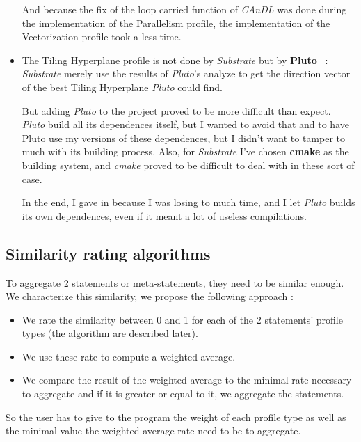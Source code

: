 \documentclass[paper=a4, fontsize=11pt]{scrartcl}
\numberwithin{equation}{section}        %
\numberwithin{figure}{section}          %
\numberwithin{table}{section}               %
\begin{document}
\begin{itemize}
            And because the fix of the loop carried function of \textit{CAnDL} was done during
            the implementation of the Parallelism profile, the implementation of the
            Vectorization profile took a less time.
        \item The Tiling Hyperplane profile is not done by \textit{Substrate} but by
            \textbf{Pluto}~\cite{pluto} : \textit{Substrate} merely use the results of
            \textit{Pluto}'s analyze to get the direction vector of the best Tiling Hyperplane
            \textit{Pluto} could find.

            But adding \textit{Pluto} to the project proved to be more difficult than expect.
            \textit{Pluto} build all its dependences itself, but I wanted to avoid that and
            to have Pluto use my versions of these dependences, but I didn't want to tamper
            to much with its building process. Also, for \textit{Substrate} I've chosen \textbf{cmake}
            as the building system, and \textit{cmake} proved to be difficult to deal with in these
            sort of case.

            In the end, I gave in because I was losing to much time, and I let \textit{Pluto} builds
            its own dependences, even if it meant a lot of useless compilations.
    \end{itemize}
    
    \subsection{Similarity rating algorithms}
    To aggregate 2 statements or meta-statements, they need to be similar enough. We characterize
    this similarity, we propose the following approach :
    \begin{itemize}
        \item We rate the similarity between 0 and 1 for each of the 2 statements' profile types
            (the algorithm are described later).
        \item We use these rate to compute a weighted average.
        \item We compare the result of the weighted average to the minimal rate necessary
            to aggregate and if it is greater or equal to it, we aggregate the statements.
    \end{itemize}
    So the user has to give to the program the weight of each profile type as well as the
    minimal value the weighted average rate need to be to aggregate.
\end{document}
